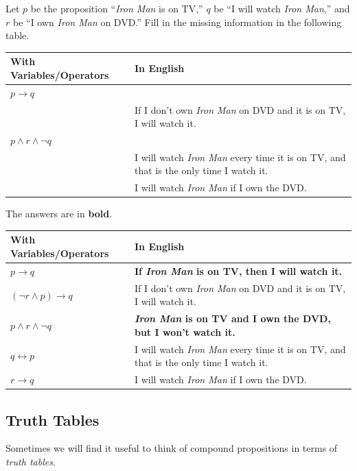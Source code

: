 \begin{fib}
Let $p$ be the proposition ``{\em Iron Man} is on TV,'' $q$ be ``I will watch {\em Iron Man},'' and
$r$ be ``I own {\em Iron Man} on DVD.''
Fill in the missing information in the following table.\\
\begin{tabular}{|l|p{}|}
\hline
With Variables/Operators&In English\\
\hline
\hline
$p\rightarrow q$&\\[.35in]
\hline
&If I don't own {\em Iron Man} on DVD and it is on TV, I will watch it.\\[.25in]
\hline
$p\wedge r \wedge\neg q$&\\[.35in]
\hline
&I will watch {\em Iron Man} every time it is on TV, and that is the only time I watch it.\\[.25in]
\hline&I will watch {\em Iron Man} if I own the DVD.\\[.25in]
\hline
\end{tabular}
\begin{answer}
The answers are in {\bf bold}.\\
\begin{tabular}[t]{|l|p{}|}
\hline
With Variables/Operators&In English\\
\hline
\hline
$p\rightarrow q$&{\bf If {\em Iron Man} is on TV, then I will watch it.}\\
\hline
\boldmath$(\neg r\wedge p)\rightarrow q$&If I don't own {\em Iron Man} on DVD and it is on TV, I will watch it.\\
\hline
$p\wedge r \wedge\neg q$&{\bf {\em Iron Man} is on TV and I own the DVD, but I won't watch it.}\\
\hline
\boldmath$q\leftrightarrow p$&I will watch {\em Iron Man} every time it is on TV, and that is the only time I watch it.\\
\hline
\boldmath$r\rightarrow q$&I will watch {\em Iron Man} if I own the DVD.\\
\hline
\end{tabular}
\end{answer}
\end{fib}


\subsection{Truth Tables}

Sometimes we will find it useful to think of compound propositions in terms of {\em truth tables}.

